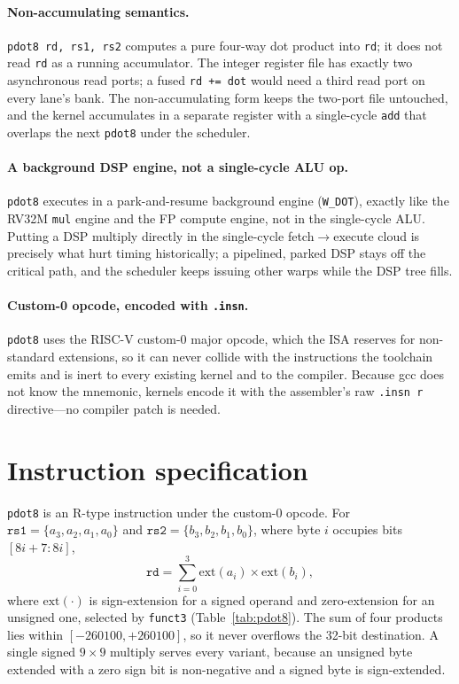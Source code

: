 \documentclass[12pt,a4paper,oneside]{report}
\newcommand{\code}[1]{\texttt{#1}}
\begin{document}
\paragraph{Non-accumulating semantics.} \code{pdot8 rd, rs1, rs2} computes a pure
four-way dot product into \code{rd}; it does not read \code{rd} as a running
accumulator. The integer register file has exactly two asynchronous read ports; a
fused \code{rd += dot} would need a third read port on every lane's bank. The
non-accumulating form keeps the two-port file untouched, and the kernel
accumulates in a separate register with a single-cycle \code{add} that overlaps
the next \code{pdot8} under the scheduler.

\paragraph{A background DSP engine, not a single-cycle ALU op.} \code{pdot8}
executes in a park-and-resume background engine (\code{W\_DOT}), exactly like the
RV32M \code{mul} engine and the FP compute engine, not in the single-cycle ALU.
Putting a DSP multiply directly in the single-cycle fetch$\rightarrow$execute
cloud is precisely what hurt timing historically; a pipelined, parked DSP stays
off the critical path, and the scheduler keeps issuing other warps while the DSP
tree fills.

\paragraph{Custom-0 opcode, encoded with \code{.insn}.} \code{pdot8} uses the
RISC-V custom-0 major opcode, which the ISA reserves for non-standard extensions,
so it can never collide with the instructions the toolchain emits and is inert to
every existing kernel and to the compiler. Because gcc does not know the mnemonic,
kernels encode it with the assembler's raw \code{.insn r} directive---no compiler
patch is needed.

\section{Instruction specification}
\code{pdot8} is an R-type instruction under the custom-0 opcode. For
$\code{rs1}=\{a_3,a_2,a_1,a_0\}$ and $\code{rs2}=\{b_3,b_2,b_1,b_0\}$, where byte
$i$ occupies bits $[8i+7:8i]$,
\begin{equation}
\code{rd} = \sum_{i=0}^{3}\mathrm{ext}(a_i)\times\mathrm{ext}(b_i),
\end{equation}
where $\mathrm{ext}(\cdot)$ is sign-extension for a signed operand and
zero-extension for an unsigned one, selected by \code{funct3}
(Table~\ref{tab:pdot8}). The sum of four products lies within
$[-260100,+260100]$, so it never overflows the 32-bit destination. A single signed
$9\times 9$ multiply serves every variant, because an unsigned byte extended with a
zero sign bit is non-negative and a signed byte is sign-extended.
\end{document}
